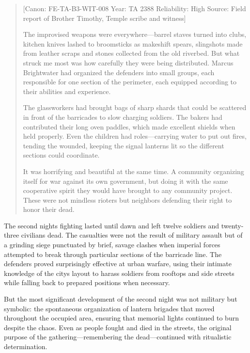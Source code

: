\begin{quote}
{[}Canon: FE-TA-B3-WIT-008 \textbar{} Year: TA 2388 \textbar{}
Reliability: High \textbar{} Source: Field report of Brother Timothy,
Temple scribe and witness{]}

The improvised weapons were everywhere---barrel staves turned into
clubs, kitchen knives lashed to broomsticks as makeshift spears,
slingshots made from leather scraps and stones collected from the old
riverbed. But what struck me most was how carefully they were being
distributed. Marcus Brightwater had organized the defenders into small
groups, each responsible for one section of the perimeter, each equipped
according to their abilities and experience.

The glassworkers had brought bags of sharp shards that could be
scattered in front of the barricades to slow charging soldiers. The
bakers had contributed their long oven paddles, which made excellent
shields when held properly. Even the children had roles---carrying water
to put out fires, tending the wounded, keeping the signal lanterns lit
so the different sections could coordinate.

It was horrifying and beautiful at the same time. A community organizing
itself for war against its own government, but doing it with the same
cooperative spirit they would have brought to any community project.
These were not mindless rioters but neighbors defending their right to
honor their dead.
\end{quote}

The second night\textquotesingle s fighting lasted until dawn and left
twelve soldiers and twenty-three civilians dead. The casualties were not
the result of military assault but of a grinding siege punctuated by
brief, savage clashes when imperial forces attempted to break through
particular sections of the barricade line. The defenders proved
surprisingly effective at urban warfare, using their intimate knowledge
of the city\textquotesingle s layout to harass soldiers from rooftops
and side streets while falling back to prepared positions when
necessary.

But the most significant development of the second night was not
military but symbolic: the spontaneous organization of lantern brigades
that moved throughout the occupied area, ensuring that memorial lights
continued to burn despite the chaos. Even as people fought and died in
the streets, the original purpose of the gathering---remembering the
dead---continued with ritualistic determination.

